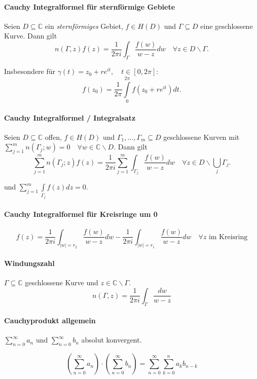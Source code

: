\documentclass[a4paper, 10pt, DIV20, headings=small]{scrartcl}
\theoremstyle{definition}
\theoremstyle{plain}
\begin{document}
\paragraph{Cauchy Integralformel für sternförmige Gebiete}
Seien $D \subseteq \mathbb{C}$ ein \emph{sternförmiges} Gebiet, $f \in H(D)$ und $\Gamma \subseteq D$ eine geschlossene Kurve. Dann gilt
$$n(\Gamma,z)f(z) = \frac{1}{2 \pi i} \int_\Gamma \frac{f(w)}{w-z} dw \quad \forall z \in D \backslash \Gamma.$$

Insbesondere für $\gamma(t) = z_0 + r e^{it},\quad t \in [0,2\pi]$:
$$f(z_0) = \frac{1}{2 \pi} \int\limits_{0}^{2 \pi}f(z_0 + r e^{it}) dt.$$

\paragraph{Cauchy Integralformel / Integralsatz}
Seien $D \subseteq \mathbb{C}$ offen, $f \in H(D)$ und $\Gamma_1, \ldots, \Gamma_m \subseteq D$ geschlossene Kurven mit $\sum\limits_{j=1}^m{n(\Gamma_j;w)} = 0\quad \forall w \in \mathbb{C} \backslash D$. Dann gilt
$$\sum\limits_{j=1}^m {n(\Gamma_j;z)}f(z) = \frac{1}{2 \pi i} \sum\limits_{j=1}^m{ \int_{\Gamma_j} \frac{f(w)}{w-z} dw} \quad \forall z \in D \backslash \bigcup_j {\Gamma_j}.$$

und $\sum\limits_{j=1}^m{\int\limits_{\Gamma_j}{f(z) dz}} = 0$.

\paragraph{Cauchy Integralformel für Kreisringe um 0}
$$f(z) = \frac{1}{2 \pi i} \int_{|w|=r_2} \frac{f(w)}{w-z} dw - \frac{1}{2 \pi i} \int_{|w|=r_1} \frac{f(w)}{w-z} dw \quad \forall z \text{ im Kreisring}$$

\paragraph{Windungszahl}
$\Gamma \subseteq \mathbb{C}$ geschlossene Kurve und $z \in \mathbb{C} \backslash \Gamma$.
$$n(\Gamma, z) = \frac{1}{2 \pi i} \int_\Gamma \frac{dw}{w-z}$$


\paragraph{Cauchyprodukt allgemein}
$\sum\limits_{n=0}^{\infty}a_n \text{ und } \sum\limits_{n=0}^{\infty}b_n$ absolut konvergent.

$$\left (\sum\limits_{n=0}^{\infty}a_n \right ) \cdot \left (\sum\limits_{n=0}^{\infty}b_n\right ) = \sum\limits_{n=0}^{\infty}{\sum\limits_{k=0}^n{a_k b_{n-k}}}$$
\end{document}
